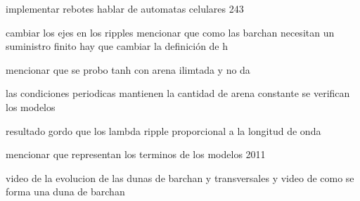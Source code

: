 implementar rebotes
hablar de automatas celulares 243

cambiar los ejes en los ripples
mencionar que como las barchan necesitan un suministro finito hay que cambiar la definición de h


mencionar que se probo tanh con arena ilimtada y no da

las condiciones periodicas mantienen la cantidad de arena constante
se verifican los modelos

resultado gordo que los lambda ripple proporcional a la longitud de onda

mencionar que representan los terminos de los modelos 2011


video de la evolucion de las dunas de barchan y transversales 
y video de como se forma una duna de barchan